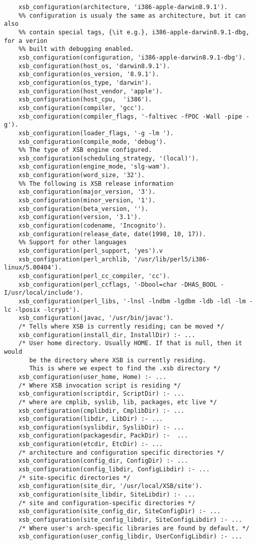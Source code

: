 \begin{description}
{\small
\begin{verbatim}
    xsb_configuration(architecture, 'i386-apple-darwin8.9.1').
    %% configuration is usualy the same as architecture, but it can also
    %% contain special tags, {\it e.g.}, i386-apple-darwin8.9.1-dbg, for a verion
    %% built with debugging enabled.
    xsb_configuration(configuration, 'i386-apple-darwin8.9.1-dbg').
    xsb_configuration(host_os, 'darwin8.9.1').
    xsb_configuration(os_version, '8.9.1').
    xsb_configuration(os_type, 'darwin').
    xsb_configuration(host_vendor, 'apple').
    xsb_configuration(host_cpu,  'i386').
    xsb_configuration(compiler, 'gcc').
    xsb_configuration(compiler_flags, '-faltivec -fPOC -Wall -pipe -g').
    xsb_configuration(loader_flags, '-g -lm ').
    xsb_configuration(compile_mode, 'debug').
    %% The type of XSB engine configured.
    xsb_configuration(scheduling_strategy, '(local)').
    xsb_configuration(engine_mode, 'slg-wam').
    xsb_configuration(word_size, '32').
    %% The following is XSB release information
    xsb_configuration(major_version, '3').
    xsb_configuration(minor_version, '1').
    xsb_configuration(beta_version, '').
    xsb_configuration(version, '3.1').
    xsb_configuration(codename, 'Incognito').
    xsb_configuration(release_date, date(1998, 10, 17)).
    %% Support for other languages
    xsb_configuration(perl_support, 'yes').v
    xsb_configuration(perl_archlib, '/usr/lib/perl5/i386-linux/5.00404').
    xsb_configuration(perl_cc_compiler, 'cc').
    xsb_configuration(perl_ccflags, '-Dbool=char -DHAS_BOOL -I/usr/local/include').
    xsb_configuration(perl_libs, '-lnsl -lndbm -lgdbm -ldb -ldl -lm -lc -lposix -lcrypt').
    xsb_configuration(javac, '/usr/bin/javac').
    /* Tells where XSB is currently residing; can be moved */
    xsb_configuration(install_dir, InstallDir) :- ...
    /* User home directory. Usually HOME. If that is null, then it would
       be the directory where XSB is currently residing.
       This is where we expect to find the .xsb directory */
    xsb_configuration(user_home, Home) :- ...
    /* Where XSB invocation script is residing */
    xsb_configuration(scriptdir, ScriptDir) :- ...
    /* where are cmplib, syslib, lib, packages, etc live */
    xsb_configuration(cmplibdir, CmplibDir) :- ...
    xsb_configuration(libdir, LibDir) :- ...
    xsb_configuration(syslibdir, SyslibDir) :- ...
    xsb_configuration(packagesdir, PackDir) :-  ...
    xsb_configuration(etcdir, EtcDir) :- ...
    /* architecture and configuration specific directories */
    xsb_configuration(config_dir, ConfigDir) :- ...
    xsb_configuration(config_libdir, ConfigLibdir) :- ...
    /* site-specific directories */
    xsb_configuration(site_dir, '/usr/local/XSB/site').
    xsb_configuration(site_libdir, SiteLibdir) :- ...
    /* site and configuration-specific directories */
    xsb_configuration(site_config_dir, SiteConfigDir) :- ...
    xsb_configuration(site_config_libdir, SiteConfigLibdir) :- ...
    /* Where user's arch-specific libraries are found by default. */
    xsb_configuration(user_config_libdir, UserConfigLibdir) :- ...
\end{verbatim}
}


\end{description}
